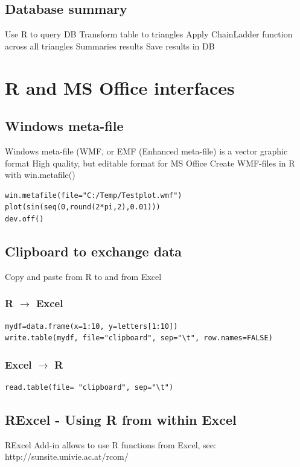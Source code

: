 \documentclass[a4paper]{article}
\begin{document}
\subsection{Database summary}
Use R to query DB
Transform table to triangles
Apply ChainLadder function across all triangles
Summaries results
Save results in DB
\section{R and MS Office interfaces}
\subsection{Windows meta-file}
Windows meta-file (WMF, or EMF (Enhanced meta-file) is a vector graphic format
High quality, but editable format for MS Office
Create WMF-files in R with win.metafile()

\begin{verbatim}
win.metafile(file="C:/Temp/Testplot.wmf")
plot(sin(seq(0,round(2*pi,2),0.01)))
dev.off()
\end{verbatim}

\subsection{Clipboard to exchange data}
Copy and paste from R to and from Excel

\subsubsection{R $\to$ Excel}

\begin{verbatim}
mydf=data.frame(x=1:10, y=letters[1:10])
write.table(mydf, file="clipboard", sep="\t", row.names=FALSE)
\end{verbatim}
\subsubsection{Excel $\to$ R}
\begin{verbatim}
read.table(file= "clipboard", sep="\t")
\end{verbatim}

\subsection{RExcel - Using R from within Excel}
RExcel Add-in allows to use R functions from Excel, see: http://sunsite.univie.ac.at/rcom/
\end{document}
